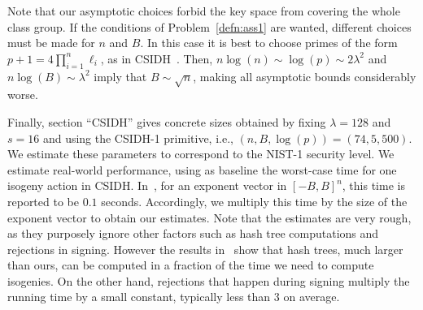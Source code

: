 \documentclass{llncs}
\begin{document}
Note that our asymptotic choices forbid the key space from covering the whole class group.
If the conditions of Problem~\ref{defn:ass1} are wanted, different choices must be made for $n$ and $B$.
In this case it is best to choose primes of the form $p+1 = 4\prod_{i=1}^n\ell_i$, as in CSIDH~\cite{CLMPR18}.
Then, $n\log(n)\sim\log(p)\sim 2\lambda^2$ and $n\log(B)\sim\lambda^2$ imply that $B\sim\sqrt{n}$, making all asymptotic bounds considerably worse.

Finally, section ``CSIDH'' gives concrete sizes obtained by fixing $\lambda=128$ and $s=16$ and using the CSIDH-1 primitive, i.e., $(n,B,\log(p)) = (74,5,500)$.
We estimate these parameters to correspond to the NIST-1 security level.
We estimate real-world performance, using as baseline the worst-case time for one isogeny action in CSIDH.
In~\cite{CLMPR18}, for an exponent vector in $[-B,B]^n$, this time is reported to be $0.1$ seconds.
Accordingly, we multiply this time by the size of the exponent vector to obtain our estimates.
Note that the estimates are very rough, as they purposely ignore other factors such as hash tree computations and rejections in signing.
However the results in~\cite{10.1007/978-3-662-49384-7_15,sphincs+} show that hash trees, much larger than ours, can be computed in a fraction of the time we need to compute isogenies.
On the other hand, rejections that happen during signing multiply the running time by a small constant, typically less than $3$ on average.
\end{document}
